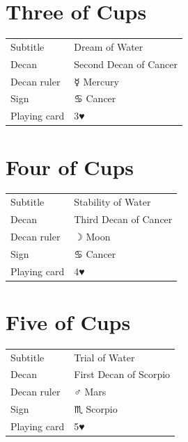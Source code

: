 \newpage
\section*{Three of Cups}

\begin{center}
\end{center}

\vspace{4mm}
\noindent\begin{tabular}{@{}l@{\quad}l@{}}
Subtitle & Dream of Water \\
Decan & Second Decan of Cancer \\
Decan ruler & {\symbfont ☿} Mercury \\
Sign & {\symbfont ♋} Cancer \\
Playing card & 3♥ \\
\end{tabular}

\newpage
\section*{Four of Cups}

\begin{center}
\end{center}

\vspace{4mm}
\noindent\begin{tabular}{@{}l@{\quad}l@{}}
Subtitle & Stability of Water \\
Decan & Third Decan of Cancer \\
Decan ruler & {\symbfont ☽} Moon \\
Sign & {\symbfont ♋} Cancer \\
Playing card & 4♥ \\
\end{tabular}

\newpage
\section*{Five of Cups}

\begin{center}
\end{center}

\vspace{4mm}
\noindent\begin{tabular}{@{}l@{\quad}l@{}}
Subtitle & Trial of Water \\
Decan & First Decan of Scorpio \\
Decan ruler & {\symbfont ♂} Mars \\
Sign & {\symbfont ♏} Scorpio \\
Playing card & 5♥ \\
\end{tabular}

